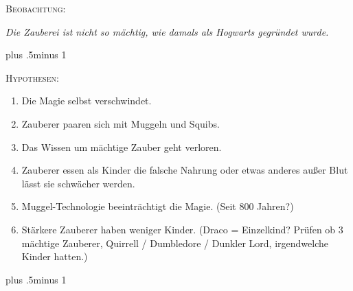 \begin{centering}
\begin{samepage}
\scshape Beobachtung:

\itshape Die Zauberei ist nicht so mächtig, wie damals als Hogwarts gegründet wurde.
\end{samepage}

\baselineskip plus .5\textheight minus 1\baselineskip

\begin{samepage}
\scshape Hypothesen:

\itshape
 \begin{enumerate}[1.]
 \firmlist
 \setlength{\leftmargin}{\parindent}
 \setlength{\rightmargin}{\parindent}
 \item Die Magie selbst verschwindet.
 \item Zauberer paaren sich mit Muggeln und Squibs.
 \item Das Wissen um mächtige Zauber geht verloren.
 \item Zauberer essen als Kinder die falsche Nahrung oder etwas anderes außer Blut lässt sie schwächer werden.
 \item Muggel-Technologie beeinträchtigt die Magie. (Seit 800 Jahren?)
 \item Stärkere Zauberer haben weniger Kinder. (Draco = Einzelkind? Prüfen ob 3 mächtige Zauberer, Quirrell / Dumbledore / Dunkler Lord, irgendwelche Kinder hatten.)
 \end{enumerate}
\end{samepage}

\baselineskip plus .5\textheight minus 1\baselineskip


\end{centering}
